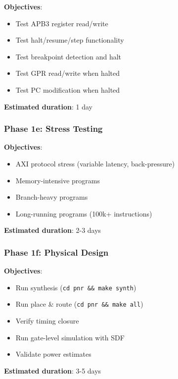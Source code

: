 \begin{record}

\textbf{Objectives}:

\begin{itemize}
\tightlist
\item
  Test APB3 register read/\allowbreak{}write
\item
  Test halt/\allowbreak{}resume/\allowbreak{}step functionality
\item
  Test breakpoint detection and halt
\item
  Test GPR read/\allowbreak{}write when halted
\item
  Test PC modification when halted
\end{itemize}

\textbf{Estimated duration}: 1 day

\end{record}

\subsubsection{Phase 1e: Stress Testing}\label{cr:fix:cpu-verification-ready:phase-1e-stress-testing}

\begin{record}

\textbf{Objectives}:

\begin{itemize}
\tightlist
\item
  AXI protocol stress (variable latency, back-pressure)
\item
  Memory-intensive programs
\item
  Branch-heavy programs
\item
  Long-running programs (100k+ instructions)
\end{itemize}

\textbf{Estimated duration}: 2-3 days

\end{record}

\subsubsection{Phase 1f: Physical Design}\label{cr:fix:cpu-verification-ready:phase-1f-physical-design}

\begin{record}

\textbf{Objectives}:

\begin{itemize}
\tightlist
\item
  Run synthesis (\texttt{cd\ pnr\ \&\&\ make\ synth})
\item
  Run place \& route (\texttt{cd\ pnr\ \&\&\ make\ all})
\item
  Verify timing closure
\item
  Run gate-level simulation with SDF
\item
  Validate power estimates
\end{itemize}

\textbf{Estimated duration}: 3-5 days

\end{record}

